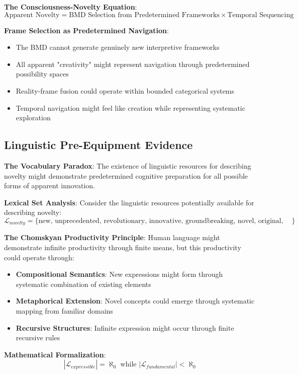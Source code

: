 \documentclass[12pt]{article}
\begin{document}
\textbf{The Consciousness-Novelty Equation}:
$$\text{Apparent Novelty} = \text{BMD Selection from Predetermined Frameworks} \times \text{Temporal Sequencing}$$

\textbf{Frame Selection as Predetermined Navigation}:
\begin{itemize}
\item The BMD cannot generate genuinely new interpretive frameworks
\item All apparent "creativity" might represent navigation through predetermined possibility spaces
\item Reality-frame fusion could operate within bounded categorical systems
\item Temporal navigation might feel like creation while representing systematic exploration
\end{itemize}

\subsection{Linguistic Pre-Equipment Evidence}

\textbf{The Vocabulary Paradox}: The existence of linguistic resources for describing novelty might demonstrate predetermined cognitive preparation for all possible forms of apparent innovation.

\textbf{Lexical Set Analysis}: Consider the linguistic resources potentially available for describing novelty:
$$\mathcal{L}_{novelty} = \{\text{new, unprecedented, revolutionary, innovative, groundbreaking, novel, original, fresh, unique, extraordinary, remarkable, unexpected, surprising, ...}\}$$

\textbf{The Chomskyan Productivity Principle}: Human language might demonstrate infinite productivity through finite means, but this productivity could operate through:
\begin{itemize}
\item \textbf{Compositional Semantics}: New expressions might form through systematic combination of existing elements
\item \textbf{Metaphorical Extension}: Novel concepts could emerge through systematic mapping from familiar domains
\item \textbf{Recursive Structures}: Infinite expression might occur through finite recursive rules
\end{itemize}

\textbf{Mathematical Formalization}:
$$|\mathcal{L}_{expressible}| = \aleph_0 \text{ while } |\mathcal{L}_{fundamental}| < \aleph_0$$
\end{document}
